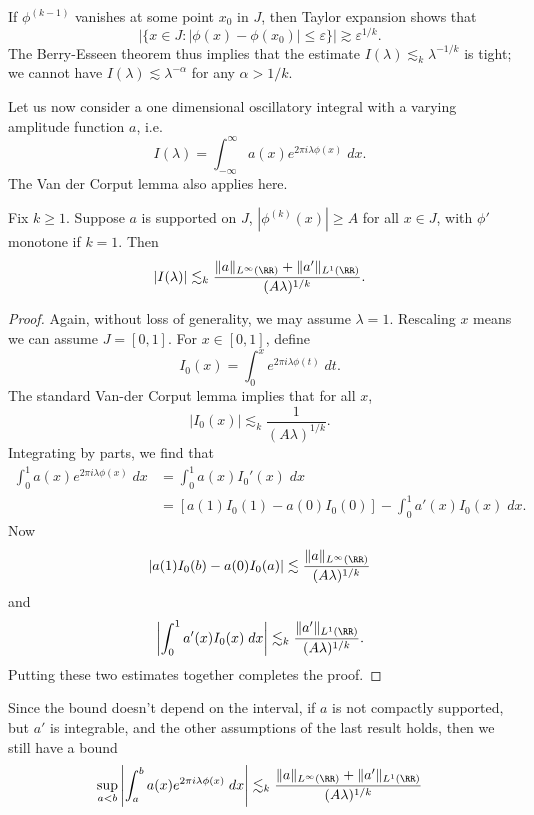 \begin{remark}
    If $\phi^{(k-1)}$ vanishes at some point $x_0$ in $J$, then Taylor expansion shows that
    \[ |\{ x \in J : |\phi(x) - \phi(x_0)| \leq \varepsilon \}| \gtrsim \varepsilon^{1/k}. \]
    The Berry-Esseen theorem thus implies that the estimate $I(\lambda) \lesssim_k \lambda^{-1/k}$ is tight; we cannot have $I(\lambda) \lesssim \lambda^{-\alpha}$ for any $\alpha > 1/k$.
\end{remark}

Let us now consider a one dimensional oscillatory integral with a varying amplitude function $a$, i.e.
%
\[ I(\lambda) = \int_{-\infty}^\infty a(x) e^{2 \pi i \lambda \phi(x)}\; dx. \]
%
The Van der Corput lemma also applies here.

\begin{lemma}
  Fix $k \geq 1$. Suppose $a$ is supported on $J$, $|\phi^{(k)}(x)| \geq A$ for all $x \in J$, with $\phi'$ monotone if $k = 1$. Then
  \[ |I(\lambda)| \lesssim_k \frac{\| a \|_{L^\infty(\RR)} + \| a' \|_{L^1(\RR)}}{(A \lambda)^{1/k}}. \]
\end{lemma}
\begin{proof}
  Again, without loss of generality, we may assume $\lambda = 1$. Rescaling $x$ means we can assume $J = [0,1]$. For $x \in [0,1]$, define
  \[ I_0(x) = \int_0^x e^{2 \pi i \lambda \phi(t)}\; dt. \]
  The standard Van-der Corput lemma implies that for all $x$,
  \[ |I_0(x)| \lesssim_k \frac{1}{(A \lambda)^{1/k}}. \]
  Integrating by parts, we find that
  \begin{align*}
    \int_0^1 a(x) e^{2 \pi i \lambda \phi(x)}\; dx &= \int_0^1 a(x) I_0'(x)\; dx\\
    &= [a(1) I_0(1) - a(0) I_0(0)] - \int_0^1 a'(x) I_0(x)\; dx.
  \end{align*}
  Now
  \[ |a(1) I_0(b) - a(0) I_0(a)| \lesssim \frac{\| a \|_{L^\infty(\RR)}}{(A \lambda)^{1/k}} \]
  and
  \[ \left| \int_0^1 a'(x) I_0(x)\; dx \right| \lesssim_k \frac{\| a' \|_{L^1(\RR)}}{(A \lambda)^{1/k}}. \]
  Putting these two estimates together completes the proof.
\end{proof}

\begin{remark}
    Since the bound doesn't depend on the interval, if $a$ is not compactly supported, but $a'$ is integrable, and the other assumptions of the last result holds, then we still have a bound
    \[ \sup_{a < b} \left| \int_a^b a(x) e^{2 \pi i \lambda \phi(x)}\; dx \right| \lesssim_k \frac{\| a \|_{L^\infty(\RR)} + \| a' \|_{L^1(\RR)}}{(A\lambda)^{1/k}} \]
\end{remark}

